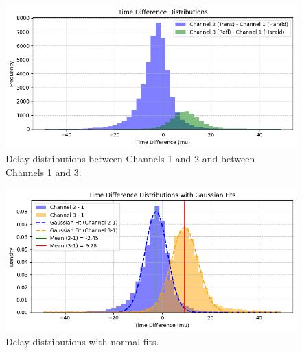 \documentclass[prl,twocolumn]{revtex4-1}
\begin{document}
\begin{figure}
    \centering
    \includegraphics[width=\linewidth]{Images/delay_distributions.png}
    \caption{Delay distributions between Channels 1 and 2 and between Channels 1 and 3.}
    \label{fig:delay_distributions}
\end{figure}

\begin{figure}
    \centering
    \includegraphics[width=\linewidth]{Images/delay_fit.png}
    \caption{Delay distributions with normal fits.}
    \label{fig:delay_fit}
\end{figure}
\end{document}
